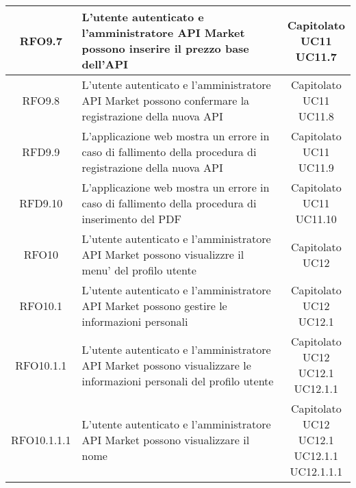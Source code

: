 \begin{longtable}{|c|p{8cm}|c|}
RFO9.7 &  L'utente autenticato e l'amministratore API Market possono inserire il prezzo base dell'API & \makecell*{Capitolato\\UC11\\UC11.7} \\
\hline

RFO9.8 & L'utente autenticato e l'amministratore API Market possono confermare la registrazione della nuova API & \makecell*{Capitolato\\UC11\\UC11.8} \\
\hline

RFD9.9 &  L'applicazione web mostra un errore in caso di fallimento della procedura di registrazione della nuova API & \makecell*{Capitolato\\UC11\\UC11.9} \\
\hline

RFD9.10 &  L'applicazione web mostra un errore in caso di fallimento della procedura di inserimento del PDF & \makecell*{Capitolato\\UC11\\UC11.10} \\
\hline

RFO10 &  L'utente autenticato e l'amministratore API Market possono visualizzre il menu' del profilo utente & \makecell*{Capitolato\\UC12} \\
\hline

RFO10.1 &  L'utente autenticato e l'amministratore API Market possono gestire le informazioni personali & \makecell*{Capitolato\\UC12\\UC12.1} \\
\hline

RFO10.1.1 &  L'utente autenticato e l'amministratore API Market possono visualizzare le informazioni personali del profilo utente &\makecell*{Capitolato\\UC12\\UC12.1\\UC12.1.1} \\
\hline

RFO10.1.1.1 &  L'utente autenticato e l'amministratore API Market possono visualizzare il nome & \makecell*{Capitolato\\UC12\\UC12.1\\UC12.1.1\\UC12.1.1.1} \\
\hline


\end{longtable}
